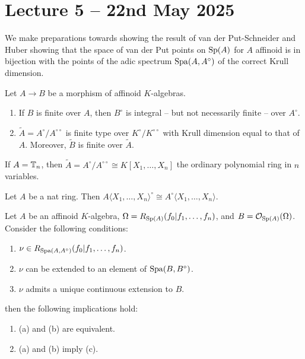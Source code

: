 \section{Lecture 5 -- 22nd May 2025}\label{sec: lecture 5}
We make preparations towards showing the result of van der Put-Schneider and Huber \cite[Thm. 4]{vdPclassification} showing that the space of van der Put points on $\mathrm{Sp}(A)$ for $A$ affinoid is in bijection with the points of the adic spectrum $\mathrm{Spa}(A,A^{\circ})$ of the correct Krull dimension. 
\begin{proposition}
    Let $A\to B$ be a morphism of affinoid $K$-algebras. 
    \begin{enumerate}[label=(\roman*)]
        \item If $B$ is finite over $A$, then $B^{\circ}$ is integral -- but not necessarily finite -- over $A^{\circ}$. 
        \item $\widetilde{A}=A^{\circ}/A^{\circ\circ}$ is finite type over $K^{\circ}/K^{\circ\circ}$ with Krull dimension equal to that of $A$. Moreover, $\widetilde{B}$ is finite over $\widetilde{A}$. 
    \end{enumerate}
\end{proposition}
\begin{example}
    If $A=\mathbb{T}_{n}$, then $\widetilde{A}=A^{\circ}/A^{\circ\circ}\cong K[X_{1},\dots,X_{n}]$ the ordinary polynomial ring in $n$ variables. 
\end{example}
\begin{proposition}\label{prop: powerbounded commutes with polynomial algebra}
    Let $A$ be a nat ring. Then $A\langle X_{1},\dots,X_{n}\rangle^{\circ}\cong A^{\circ}\langle X_{1},\dots,X_{n}\rangle$. 
\end{proposition}
\begin{lemma}\label{lem: key lemma vdP points}
    Let $A$ be an affinoid $K$-algebra, $\Omega=R_{\mathrm{Sp}(A)}(f_{0}|f_{1},\dots,f_{n})$, and $B=\mathcal{O}_{\mathrm{Sp}(A)}(\Omega)$. Consider the following conditions:
    \begin{enumerate}[label=(\alph*)]
        \item $\nu\in R_{\mathrm{Spa}(A,A^{\circ})}(f_{0}|f_{1},\dots,f_{n})$. 
        \item $\nu$ can be extended to an element of $\mathrm{Spa}(B,B^{\circ})$. 
        \item $\nu$ admits a unique continuous extension to $B$. 
    \end{enumerate}
    then the following implications hold:
    \begin{enumerate}[label=(\roman*)]
        \item (a) and (b) are equivalent. 
        \item (a) and (b) imply (c). 
    \end{enumerate}
\end{lemma}
